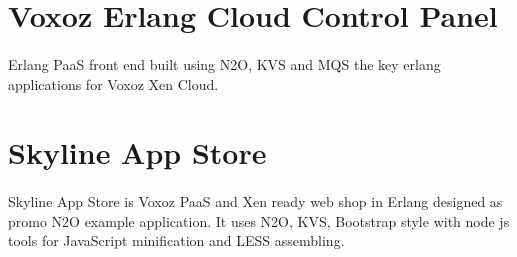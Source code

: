 \documentclass[11pt]{article}
\begin{document}

\section*{Voxoz Erlang Cloud Control Panel}
\paragraph{}
    Erlang PaaS front end built using N2O, KVS and MQS the key erlang
    applications for Voxoz Xen Cloud.




\section*{Skyline App Store}
\paragraph{}
    Skyline App Store is Voxoz PaaS and Xen ready web shop in Erlang designed as
    promo N2O example application. It uses N2O, KVS, Bootstrap style with
    node js tools for JavaScript minification and LESS assembling.





\end{document}
